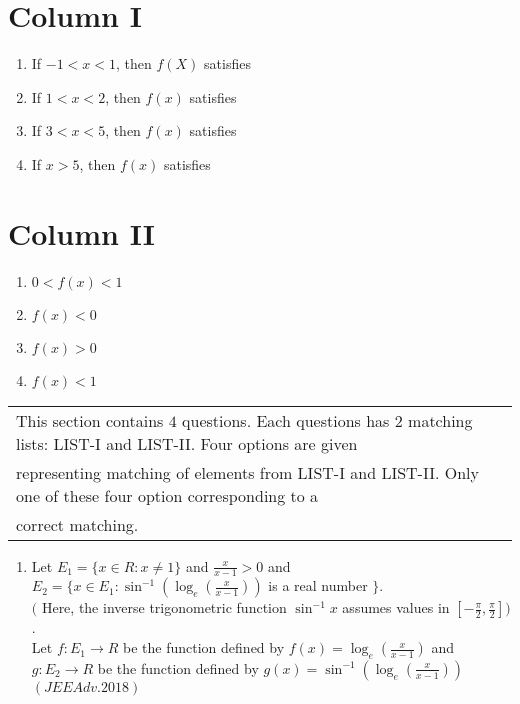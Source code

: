\documentclass[journal,12pt,twocolumn,article]{IEEEtran}
\theoremstyle{remark}
\begin{document}
			              \begin{multicols}{2}
					      \section*{ Column I}
						\begin{enumerate}[label=(\Alph*)]
							\item If $-1<x<1$, then $f(X)$ satisfies
							\item If $1<x<2$, then $f(x)$ satisfies
							\item If $3<x<5$, then $f(x)$ satisfies
							\item If $x>5$, then $f(x)$ satisfies
						\end{enumerate}
						\columnbreak
						\section*{ Column II}
						\begin{enumerate}[label=(\alph*) ,start=16]
							\item $0<f(x)<1$
							\item $f(x)<0$
							\item $f(x)>0$
							\item $f(x)<1$
						\end{enumerate}
					\end{multicols}
         \begin{tabular}{l|l}
\\
\hline
This section contains $4$ questions. Each questions has $2$ matching lists: LIST-I and LIST-II. Four options are given\\representing matching of elements from LIST-I and LIST-II. Only one of these four option corresponding to a\\correct matching.
\\
\hline
\end{tabular}
		 \begin{enumerate}[start=3]
			 \item Let $E_1=\{x\in R:x\neq1\}$ and $\frac{x}{x-1}>0$ and $E_2=\{x\in E_1:\sin^{-1}(\log_e(\frac{x}{x-1}))$ is a real number $\}$.\\ 
				 $($ Here, the inverse trigonometric function $\sin^{-1}x$ assumes values in $[-\frac{\pi}{2},\frac{\pi}{2}])$.\\
		Let $f:E_1\to R$ be the function defined by $f(x)=\log_e(\frac{x}{x-1})$ and $g:E_2\to R$ be the function defined by $g(x)=\sin^{-1}(\log_e(\frac{x}{x-1}))$
		  \hfill${(JEE Adv.2018)}$
                 \end{enumerate}
\end{document}
